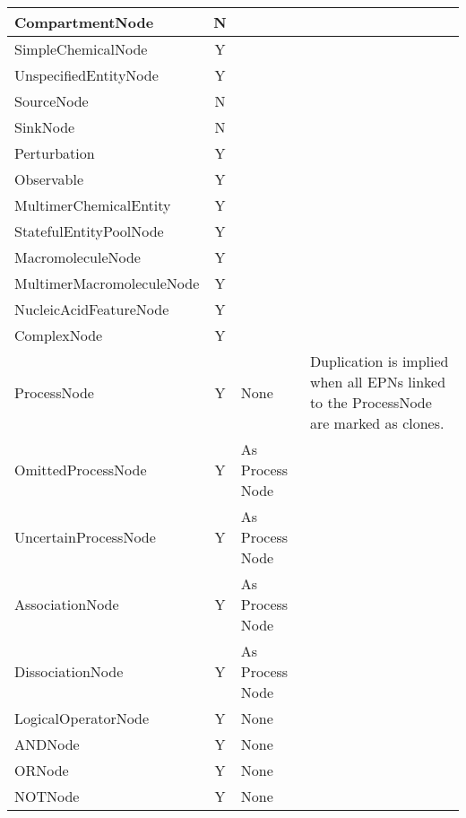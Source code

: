 \begin{center}
\label{tab:processduprules}
\begin{footnotesize}
\tablelasttail{\hline}
\begin{supertabular}{|l|c|p{4cm}|p{3.5cm}|}\hline
CompartmentNode   & N & & \\\hline
SimpleChemicalNode & Y &  & \\\hline
UnspecifiedEntityNode & Y &  & \\\hline
SourceNode & N & & \\\hline
SinkNode & N & & \\\hline
Perturbation & Y &  & \\\hline
Observable & Y &  & \\\hline
MultimerChemicalEntity & Y &  & \\\hline
StatefulEntityPoolNode & Y &  & \\\hline
MacromoleculeNode & Y &  & \\\hline
MultimerMacromoleculeNode & Y &  & \\\hline
Nucleic\-Acid\-FeatureNode & Y &  & \\\hline
ComplexNode & Y &  & \\\hline
ProcessNode & Y & None & Duplication is implied when all EPNs linked to the ProcessNode are marked as clones.\\\hline
OmittedProcessNode & Y & As Process Node & \\\hline
UncertainProcessNode & Y & As Process Node & \\\hline
AssociationNode & Y & As Process Node & \\\hline
DissociationNode & Y & As Process Node & \\\hline
LogicalOperatorNode & Y & None & \\\hline
ANDNode & Y & None & \\\hline
ORNode & Y & None & \\\hline
NOTNode & Y & None & \\\hline
\end{supertabular}
\end{footnotesize}
\end{center}

